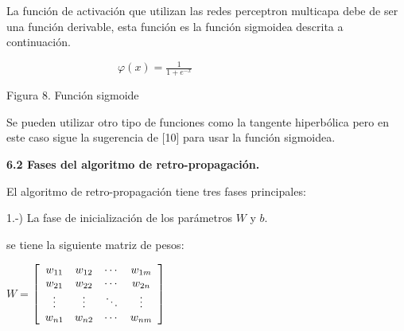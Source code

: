 La funci\'{o}n de activaci\'{o}n que utilizan las redes perceptron multicapa
debe de ser una funci\'{o}n derivable, esta funci\'{o}n es la funci\'{o}n
sigmoidea descrita a continuaci\'{o}n.$\qquad\qquad\qquad\qquad\qquad\qquad$

\begin{center}
$\qquad\qquad\qquad\qquad\qquad\varphi(x)=\frac{1}{1+e^{-x}}$

\qquad\qquad%
{}%


Figura 8. Funci\'{o}n sigmoide
\end{center}

Se pueden utilizar otro tipo de funciones como la tangente hiperb\'{o}lica
pero en este caso sigue la sugerencia de [10] para usar la funci\'{o}n sigmoidea.

\textbf{6.2 Fases del algoritmo de retro-propagaci\'{o}n.}

El algoritmo de retro-propagaci\'{o}n tiene tres fases principales:

1.-) La fase de inicializaci\'{o}n de los par\'{a}metros $W$ y $b$.

se tiene la siguiente matriz de pesos:

\begin{center}
\qquad$W=$\bigskip$\left[
\begin{array}
[c]{cccc}%
w_{11} & w_{12} & \cdots & w_{1m}\\
w_{21} & w_{22} & \cdots & w_{2n}\\
\vdots & \vdots & \ddots & \vdots\\
w_{n1} & w_{n2} & \cdots & w_{nm}%
\end{array}
\right]  $
\end{center}

